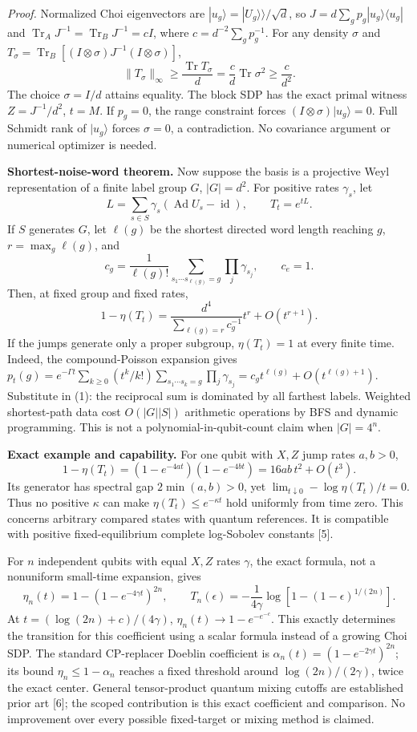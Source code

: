 \documentclass[10pt,a4paper]{article}
\newcommand{\Tr}{\operatorname{Tr}}
\newcommand{\id}{\operatorname{id}}
\newcommand{\Ad}{\operatorname{Ad}}
\begin{document}
\textit{Proof.} Normalized Choi eigenvectors are $|u_g\rangle=|U_g\rangle\!\rangle/\sqrt d$, so $J=d\sum_gp_g|u_g\rangle\langle u_g|$ and
$\Tr_AJ^{-1}=\Tr_BJ^{-1}=cI$, where $c=d^{-2}\sum_gp_g^{-1}$.
For any density $\sigma$ and $T_\sigma=\Tr_B[(I\otimes\sigma)J^{-1}(I\otimes\sigma)]$,
\[
 \|T_\sigma\|_\infty\ge\frac{\Tr T_\sigma}{d}
 =\frac c d\Tr\sigma^2\ge\frac c{d^2}.
\]
The choice $\sigma=I/d$ attains equality. The block SDP has the exact primal witness $Z=J^{-1}/d^2$, $t=M$. If $p_g=0$, the range constraint forces $(I\otimes\sigma)|u_g\rangle=0$. Full Schmidt rank of $|u_g\rangle$ forces $\sigma=0$, a contradiction. No covariance argument or numerical optimizer is needed.

\textbf{Shortest-noise-word theorem.} Now suppose the basis is a projective Weyl representation of a finite label group $G$, $|G|=d^2$. For positive rates $\gamma_s$, let
\[
 L=\sum_{s\in S}\gamma_s(\Ad U_s-\id),\qquad T_t=e^{tL}.
\]
If $S$ generates $G$, let $\ell(g)$ be the shortest directed word length reaching $g$, $r=\max_g\ell(g)$, and
\[
 c_g=\frac{1}{\ell(g)!}
 \sum_{s_1\cdots s_{\ell(g)}=g}\prod_j\gamma_{s_j},
 \qquad c_e=1.
\]
Then, at fixed group and fixed rates,
\[
 \boxed{\ 1-\eta(T_t)=
 \frac{d^4}{\sum_{\ell(g)=r}c_g^{-1}}t^r+O(t^{r+1}).\ }
 \tag{2}
\]
If the jumps generate only a proper subgroup, $\eta(T_t)=1$ at every finite time.
Indeed, the compound-Poisson expansion gives
$p_t(g)=e^{-\Gamma t}\sum_{k\ge0}(t^k/k!)\sum_{s_1\cdots s_k=g}\prod_j\gamma_{s_j}
=c_gt^{\ell(g)}+O(t^{\ell(g)+1})$.
Substitute in (1): the reciprocal sum is dominated by all farthest labels. Weighted shortest-path data cost $O(|G||S|)$ arithmetic operations by BFS and dynamic programming. This is not a polynomial-in-qubit-count claim when $|G|=4^n$.

\textbf{Exact example and capability.} For one qubit with $X,Z$ jump rates $a,b>0$,
\[
 1-\eta(T_t)=(1-e^{-4at})(1-e^{-4bt})=16ab\,t^2+O(t^3).
 \tag{3}
\]
Its generator has spectral gap $2\min(a,b)>0$, yet
$\lim_{t\downarrow0}-\log\eta(T_t)/t=0$.
Thus no positive $\kappa$ can make $\eta(T_t)\le e^{-\kappa t}$ hold uniformly from time zero. This concerns arbitrary compared states with quantum references. It is compatible with positive fixed-equilibrium complete log-Sobolev constants [5].

For $n$ independent qubits with equal $X,Z$ rates $\gamma$, the exact formula, not a nonuniform small-time expansion, gives
\[
 \eta_n(t)=1-(1-e^{-4\gamma t})^{2n},\qquad
 T_n(\epsilon)=-\frac1{4\gamma}\log\!\left[1-(1-\epsilon)^{1/(2n)}\right].
 \tag{4}
\]
At $t=(\log(2n)+c)/(4\gamma)$, $\eta_n(t)\to1-e^{-e^{-c}}$.
This exactly determines the transition for this coefficient using a scalar formula instead of a growing Choi SDP. The standard CP-replacer Doeblin coefficient is
$\alpha_n(t)=(1-e^{-2\gamma t})^{2n}$; its bound $\eta_n\le1-\alpha_n$ reaches a fixed threshold around $\log(2n)/(2\gamma)$, twice the exact center. General tensor-product quantum mixing cutoffs are established prior art [6]; the scoped contribution is this exact coefficient and comparison. No improvement over every possible fixed-target or mixing method is claimed.
\end{document}
